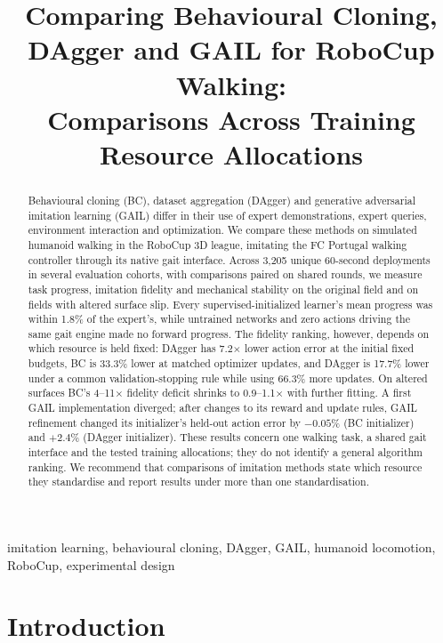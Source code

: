 \documentclass[conference]{IEEEtran}
\title{Comparing Behavioural Cloning, DAgger and GAIL for RoboCup Walking:\\
Comparisons Across Training Resource Allocations}
\author{\IEEEauthorblockN{Author name to be supplied}
\IEEEauthorblockA{School and institution to be supplied\\
Email to be supplied}}
\begin{document}
\maketitle

\begin{abstract}
Behavioural cloning (BC), dataset aggregation (DAgger) and generative adversarial imitation learning (GAIL) differ in their use of expert demonstrations, expert queries, environment interaction and optimization. We compare these methods on simulated humanoid walking in the RoboCup 3D league, imitating the FC Portugal walking controller through its native gait interface. Across 3,205 unique 60-second deployments in several evaluation cohorts, with comparisons paired on shared rounds, we measure task progress, imitation fidelity and mechanical stability on the original field and on fields with altered surface slip. Every supervised-initialized learner's mean progress was within 1.8\% of the expert's, while untrained networks and zero actions driving the same gait engine made no forward progress. The fidelity ranking, however, depends on which resource is held fixed: DAgger has 7.2$\times$ lower action error at the initial fixed budgets, BC is 33.3\% lower at matched optimizer updates, and DAgger is 17.7\% lower under a common validation-stopping rule while using 66.3\% more updates. On altered surfaces BC's 4--11$\times$ fidelity deficit shrinks to 0.9--1.1$\times$ with further fitting. A first GAIL implementation diverged; after changes to its reward and update rules, GAIL refinement changed its initializer's held-out action error by $-0.05$\% (BC initializer) and $+2.4$\% (DAgger initializer). These results concern one walking task, a shared gait interface and the tested training allocations; they do not identify a general algorithm ranking. We recommend that comparisons of imitation methods state which resource they standardise and report results under more than one standardisation.
\end{abstract}

\begin{IEEEkeywords}
imitation learning, behavioural cloning, DAgger, GAIL, humanoid locomotion, RoboCup, experimental design
\end{IEEEkeywords}

\section{Introduction}
\end{document}
